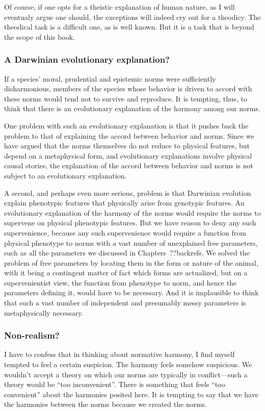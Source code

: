 Of course, if one opts for a theistic explanation of human nature, as I will eventualy argue one should, the exceptions 
will indeed cry out for a theodicy. The theodical task is a difficult one, as is well known. But it is a task that is 
beyond the scope of this book.

\subsubsection{A Darwinian evolutionary explanation?}
If a species' moral, prudential and epistemic norms were sufficiently disharmonious, members of the species whose 
behavior is driven to accord with these norms would tend not to survive and reproduce. It is tempting, thus, to think
that there is an evolutionary explanation of the harmony among our norms. 

One problem with such an evolutionary explanation is that it pushes back the problem to that of explaining the accord
between behavior and norms. Since we have argued that the norms themselves do not reduce to physical features, but 
depend on a metaphysical form, and evolutionary explanations involve physical causal stories, the explanation of the 
accord between behavior and norms is not subject to an evolutionary explanation. 

A second, and perhaps even more serious, problem is that Darwinian evolution explain phenotypic features that physically arise 
from genotypic features. An evolutionary explanation of the harmony of the norms would require the norms to supervene on 
physical phenotypic features. But we have reason to deny any such supervenience, because any such supervenience would require
a function from physical phenotype to norms with a vast number of unexplained free parameters, such as all the parameters we
discussed in Chapters~??backrefs. We solved the problem of free parameters by locating them in the form or nature of the 
animal, with it being a contingent matter of fact which forms are actualized, but on a supervenientist view, the function 
from phenotype to norm, and hence the parameters defining it, would have to be necessary. And it is implausible to think 
that such a vast number of independent and presumably messy parameters is metaphysically necessary.

\subsubsection{Non-realism?}\label{sec:non-realism}
I have to confess that in thinking about normative harmony, I find myself tempted to feel 
a certain suspicion. The harmony feels somehow suspicious. We wouldn't accept a theory on which
our norms are typically in conflict---such a theory would be ``too inconvenient''. There is something 
that feels ``too convenient'' about the harmonies posited here. It is tempting to say that we have 
the harmonies between the norms because we created the norms.

